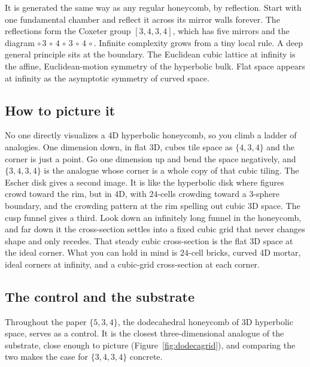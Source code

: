 It is generated the same way as any regular honeycomb, by reflection. Start with one fundamental chamber and reflect it across its mirror walls forever. The reflections form the Coxeter group $[3,4,3,4]$, which has five mirrors and the diagram $\circ\,3\,\circ\,4\,\circ\,3\,\circ\,4\,\circ$. Infinite complexity grows from a tiny local rule. A deep general principle sits at the boundary. The Euclidean cubic lattice at infinity is the affine, Euclidean-motion symmetry of the hyperbolic bulk. Flat space appears at infinity as the asymptotic symmetry of curved space.

\subsection{How to picture it}

No one directly visualizes a 4D hyperbolic honeycomb, so you climb a ladder of analogies. One dimension down, in flat 3D, cubes tile space as $\{4,3,4\}$ and the corner is just a point. Go one dimension up and bend the space negatively, and $\{3,4,3,4\}$ is the analogue whose corner is a whole copy of that cubic tiling. The Escher disk gives a second image. It is like the hyperbolic disk where figures crowd toward the rim, but in 4D, with $24$-cells crowding toward a $3$-sphere boundary, and the crowding pattern at the rim spelling out cubic 3D space. The cusp funnel gives a third. Look down an infinitely long funnel in the honeycomb, and far down it the cross-section settles into a fixed cubic grid that never changes shape and only recedes. That steady cubic cross-section is the flat 3D space at the ideal corner. What you can hold in mind is $24$-cell bricks, curved 4D mortar, ideal corners at infinity, and a cubic-grid cross-section at each corner.

\subsection{The control and the substrate}

Throughout the paper $\{5,3,4\}$, the dodecahedral honeycomb of 3D hyperbolic space, serves as a control. It is
the closest three-dimensional analogue of the substrate, close enough to picture (Figure~\ref{fig:dodecagrid}),
and comparing the two makes the case for $\{3,4,3,4\}$ concrete.

